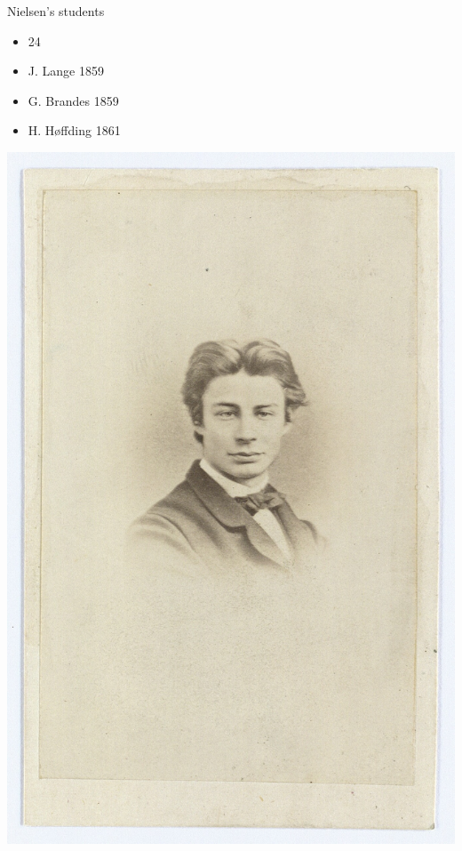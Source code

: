 \documentclass{beamer}
\begin{document}
\begin{frame}{Nielsen’s students}
\begin{itemize}
  \item 24
  \item J. Lange 1859
  \item G. Brandes 1859
  \item H. Høffding 1861
\end{itemize}
\includegraphics[width=0.9\linewidth]{slide24_img8.jpg}

\end{frame}
\end{document}
